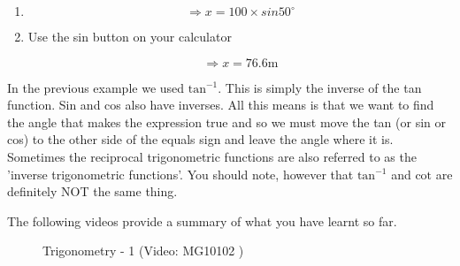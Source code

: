 {\begin{mdframed}[linewidth=4, leftmargin=40, rightmargin=40]
\begin{exercise}
\begin{enumerate}[noitemsep, label=\textbf{Step} \textbf{\arabic*}. ]
    \begin{equation}
    sin{50}^{\circ }=\frac{x}{100}\tag{14.12}
      \end{equation}
      \item  
      \label{m39408*id81247}\nopagebreak\noindent{}
        
    \begin{equation}
    \ensuremath{\Rightarrow}x=100\ensuremath{\times}sin{50}^{\circ }\tag{14.13}
      \end{equation}
      \item  
      \label{m39408*id81284}Use the sin
 button on your calculator\par 
      \label{m39408*id81293}\nopagebreak\noindent{}
        
    \begin{equation}
    \ensuremath{\Rightarrow}x=76.6\mathrm{m}\tag{14.14}
      \end{equation}
      \end{enumerate}
    \end{exercise}
    \end{mdframed}
    }
    \noindent
\par
    \noindent
\label{m39408*eip-200}In the previous example we used ${\mathrm{tan}}^{-1}$. This is simply the inverse of the tan function. Sin and cos also have inverses. All this means is that we want to find the angle that makes the expression true and so we must move the tan (or sin or cos) to the other side of the equals sign and leave the angle where it is. Sometimes the reciprocal trigonometric functions are also referred to as the 'inverse trigonometric functions'. You should note, however that ${\mathrm{tan}}^{-1}$ and $\mathrm{cot}$ are definitely NOT the same thing. \par \label{m39408*eip-358}The following videos provide a summary of what you have learnt so far.
    \setcounter{subfigure}{0}
	\begin{figure}[H] %
    \textnormal{Trigonometry - 1}\vspace{.1in} \nopagebreak
  \label{m39408*yt-media}\label{m39408*yt-video}
             { (Video:  MG10102 )}
      \vspace{2pt}
    \vspace{.1in}
 \end{figure}       \par \label{m39408*eip-33}
